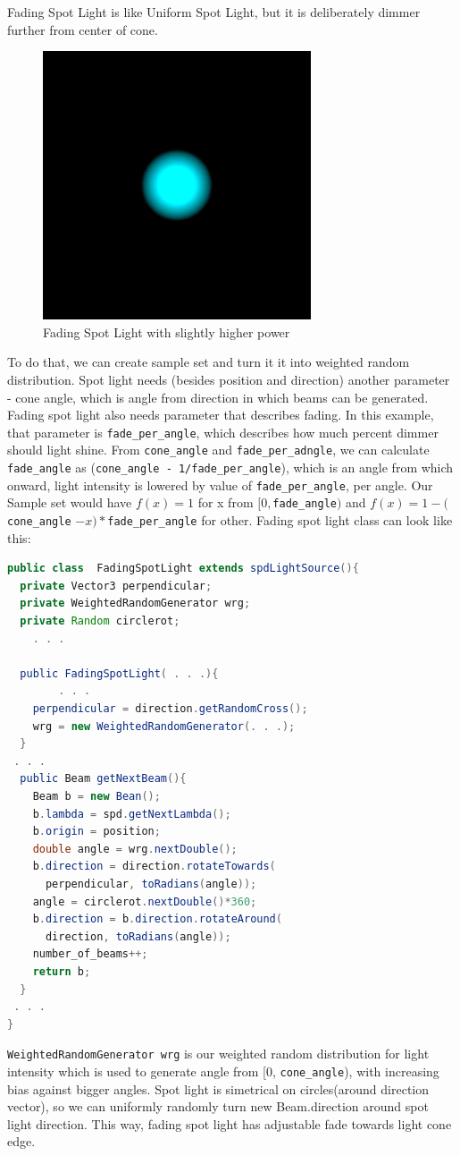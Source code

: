 \documentclass[12pt, letterpaper]{article}
\begin{document}
Fading Spot Light is like Uniform Spot Light, but it is deliberately dimmer further from center of cone.
\begin{figure}[H]
\centering 
\includegraphics[scale=0.5]{FSL.png}
\caption{Fading Spot Light with slightly higher power}
\end{figure}
To do that, we can create sample set and turn it it into weighted random distribution. Spot light needs (besides position and direction) another parameter - cone angle, which is angle from direction in which beams can be generated. Fading spot light also needs parameter that describes fading. In this example, that parameter is \verb|fade_per_angle|, which describes how much percent dimmer should light shine. From \verb|cone_angle| and \verb|fade_per_adngle|, we can calculate \verb|fade_angle| as (\verb|cone_angle - 1/fade_per_angle|), which is an angle from which onward, light intensity is lowered by value of \verb|fade_per_angle|, per angle. Our Sample set would have $f(x) = 1$ for x from $[0,$\verb|fade_angle|$)$ and $f(x) = 1 - ($\verb|cone_angle| $- x)*$\verb|fade_per_angle| for other. Fading spot light class can look like this:
\begin{lstlisting}[language=Java]
public class  FadingSpotLight extends spdLightSource(){
  private Vector3 perpendicular;
  private WeightedRandomGenerator wrg; 
  private Random circlerot;
 	. . .

  public FadingSpotLight( . . .){
		. . .
	perpendicular = direction.getRandomCross();
	wrg = new WeightedRandomGenerator(. . .);
  }
 . . .
  public Beam getNextBeam(){
	Beam b = new Bean();
	b.lambda = spd.getNextLambda();
	b.origin = position;
	double angle = wrg.nextDouble();
	b.direction = direction.rotateTowards(
	  perpendicular, toRadians(angle));
	angle = circlerot.nextDouble()*360;
	b.direction = b.direction.rotateAround(
	  direction, toRadians(angle)); 
	number_of_beams++;
	return b;
  }
 . . .
}
\end{lstlisting}
\verb|WeightedRandomGenerator wrg| is our weighted random distribution for light intensity which is used to generate angle from [0, \verb|cone_angle|), with increasing bias against bigger angles. Spot light is simetrical on circles(around direction vector), so we can uniformly randomly turn new Beam.direction around spot light direction. This way, fading spot light has adjustable fade towards light cone edge.
\end{document}
